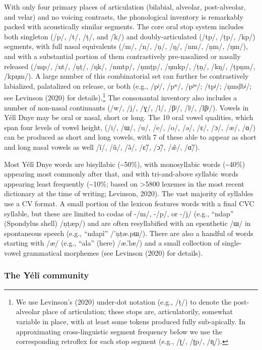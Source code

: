 \documentclass[english,,man,floatsintext]{apa6}
\begin{document}
With only four primary places of articulation (bilabial, alveolar, post-alveolar, and velar) and no voicing contrasts, the phonological inventory is remarkably packed with acoustically similar segments. The core oral stop system includes both singleton (/p/, /t/, /ṭ/, and /k/) and doubly-articulated (/tp/, /ṭp/, /kp/) segments, with full nasal equivalents (/m/, /n/, /ṇ/, /ŋ/, /nm/, /ṇm/, /ŋm/), and with a substantial portion of them contrastively pre-nasalized or nasally released (/mp/, /nt/, /ṇṭ/, /ŋk/, /nmtp/, /ṇmṭp/, /ŋmkp/, /ṭṇ/, /kŋ/, /ṭpṇm/, /kpŋm/). A large number of this combinatorial set can further be contrastively labialized, palatalized on release, or both (e.g., /pʲ/, /pʷ/, /pʲʷ/; /tpʲ/; /ṇmḍbʲ/; see Levinson (2020) for details).\footnote{We use Levinson's (2020) under-dot notation (e.g., /ṭ/) to denote the post-alveolar place of articulation; these stops are, articulatorily, somewhat variable in place, with at least some tokens produced fully sub-apically. In approximating cross-linguistic segment frequency below we use the corresponding retroflex for each stop segment (e.g., /ʈ/, /ʈp/, /ɳ/).} The consonantal inventory also includes a number of non-nasal continuants (/w/, /j/, /ɣ/, /l/, /βʲ/, /lʲ/, /lβʲ/). Vowels in Yélî Dnye may be oral or nasal, short or long. The 10 oral vowel qualities, which span four levels of vowel height, (/i/, /ɯ/, /u/, /e/, /o/, /ə/, /ɛ/, /ɔ/, /æ/, /ɑ/) can be produced as short and long vowels, with 7 of these able to appear as short and long nasal vowels as well /ĩ/, /ũ/, /ə̃/, /ɛ̃/, /ɔ̃/, /æ̃/, /ɑ̃/).

Most Yélî Dnye words are bisyllabic (\textasciitilde{}50\%), with monosyllabic words (\textasciitilde{}40\%) appearing most commonly after that, and with tri-and-above syllabic words appearing least frequently (\textasciitilde{}10\%; based on \textgreater{}5800 lexemes in the most recent dictionary at the time of writing; Levinson, 2020). The vast majority of syllables use a CV format. A small portion of the lexicon features words with a final CVC syllable, but these are limited to codas of -/m/, -/p/, or -/j/ (e.g., \enquote{ndap} (Spondylus shell) /ṇṭæp/) and are often resyllabified with an epenthetic /ɯ/ in spontaneous speech (e.g., \enquote{ndapî} /'ṇṭæ.pɯ/). There are also a handful of words starting with /æ/ (e.g., \enquote{ala} (here) /æ.'læ/) and a small collection of single-vowel grammatical morphemes (see Levinson (2020) for details).

\hypertarget{the-yuxe9luxee-community}{%
\subsubsection{The Yélî community}\label{the-yuxe9luxee-community}}
\end{document}
